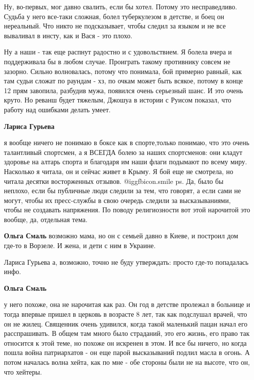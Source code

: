 \begin{itemize}
Ну, во-первых, мог давно свалить, если бы хотел. Потому это несправедливо.
Судьба у него все-таки сложная, болел туберкулезом в детстве, и боец он
нереальный. Что никто не подсказывает, чтобы следил за языком и не все
вываливал в инсту, как и Вася - это плохо. 

Ну а наши - так еще распнут радостно и с удовольствием. Я болела вчера и
поддерживала бы в любом случае. Проиграть такому противнику совсем не зазорно.
Сильно волновалась, потому что понимала, бой примерно равный, как там судьи
сложат по раундам - хз, по очкам может быть всякое, потому в конце 12 прям
завопила, разбудив мужа, появился очень серьезный шанс. И это очень круто.  Но
реванш будет тяжелым, Джошуа в истории с Руисом показал, что работу над
ошибками делать умеет.

\begin{itemize} %
\textbf{Лариса Гурьева} 

я вообще ничего не понимаю в боксе как в спорте,только понимаю, что это очень
талантливый спортсмен, а я ВСЕГДА болею за наших спортсменов: они кладут
здоровье на алтарь спорта и благодаря им наши флаги подымают по всему миру.
Насколько я читала, он и сейчас живет в Крыму. Я бой еще не смотрела, но читала
десятки восторженных отзывов.  @igg{fbicon.smile}  ps. Да, было бы неплохо, если бы публичные
люди следили за тем, что говорят, а если сами не могут, чтобы их пресс-службы в
свою очередь следили за высказываниями, чтобы не создавать напряжения. По
поводу религиозности вот этой нарочитой это вообще, да, отдельная тема.


\textbf{Ольга Смаль} возможно мама, но он с семьей давно в Киеве, и построил дом где-то в Ворзеле. И жена, и дети с ним в Украине.

Лариса Гурьева а, возможно, точно не буду утверждать: просто где-то попадалась инфо.

\textbf{Ольга Смаль} 

у него похоже, она не нарочитая как раз. Он год в детстве пролежал в больнице и
тогда впервые пришел в церковь в возрасте 8 лет, так как подслушал врачей, что
он не жилец. Священник очень удивился, когда такой маленький пацан начал его
расспрашивать. В общем там много было страданий, это его жизнь, его право так
относится к этой теме, но похоже он искренен в этом. И все бы ничего, но когда
пошла война патриархатов - он еще парой высказываний подлил масла в огонь. А
потом началась волна хейта, как по мне - обе стороны были не на высоте, что он,
что хейтеры.


\end{itemize}
\end{itemize}
